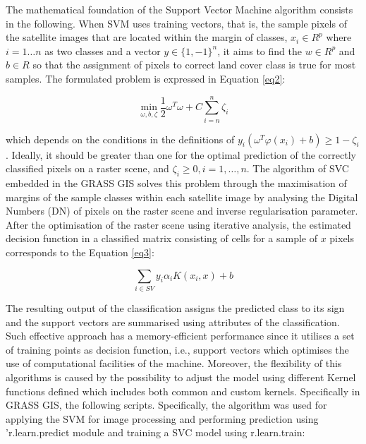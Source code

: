 \documentclass{elektr}
\begin{document}
The mathematical foundation of the Support Vector Machine algorithm consists in the following. When SVM uses training vectors, that is, the sample pixels of the satellite images that are located within the margin of classes,
$x_{i} \in R^p$ where $ i=1 \dots n$ as two classes and a vector $y \in \{1, - 1\}^n$, it aims to find the $w \in R^p$ and $b \in R$ so that the assignment of pixels to correct land cover class is true for most samples. The formulated problem is expressed in Equation \ref{eq2}:

\begin{equation}
\min_{\omega,b,\zeta}\frac{1}{2}\omega^T\omega+C\sum_{i=n}^{n}\zeta_{i}
\label{eq2}
\end{equation}

which depends on the conditions in the definitions of $y_{i}(\omega^{T}\varphi (x_i) + b)\geq 1-\zeta_{i}$. Ideally, it should be greater than one for the optimal prediction of the correctly classified pixels on a raster scene, and $\zeta_{i}\geq 0, i = 1,\dots,n$. The algorithm of SVC embedded in the GRASS GIS solves this problem through the maximisation of margins of the sample classes within each satellite image by analysing the Digital Numbers (DN) of pixels on the raster scene and inverse regularisation parameter. After the optimisation of the raster scene using iterative analysis, the estimated decision function in a classified matrix consisting of cells for a sample of $x$ pixels corresponds to the Equation \ref{eq3}:

\begin{equation}
\sum_{i\in SV}y_{i}\alpha_{i}K(x_{i},x) + b
\label{eq3}
\end{equation}

The resulting output of the classification assigns the predicted class to its sign and the support vectors are summarised using attributes of the classification. Such effective approach has a memory-efficient performance since it utilises a set of training points as decision function, i.e., support vectors which optimises the use of computational facilities of the machine. Moreover, the flexibility of this algorithms is caused by the possibility to adjust the model using different Kernel functions defined which includes both common and custom kernels. Specifically in GRASS GIS, the following scripts. Specifically, the algorithm was used for applying the SVM for image processing and performing prediction using 'r.learn.predict module and training a SVC model using r.learn.train:
\end{document}
